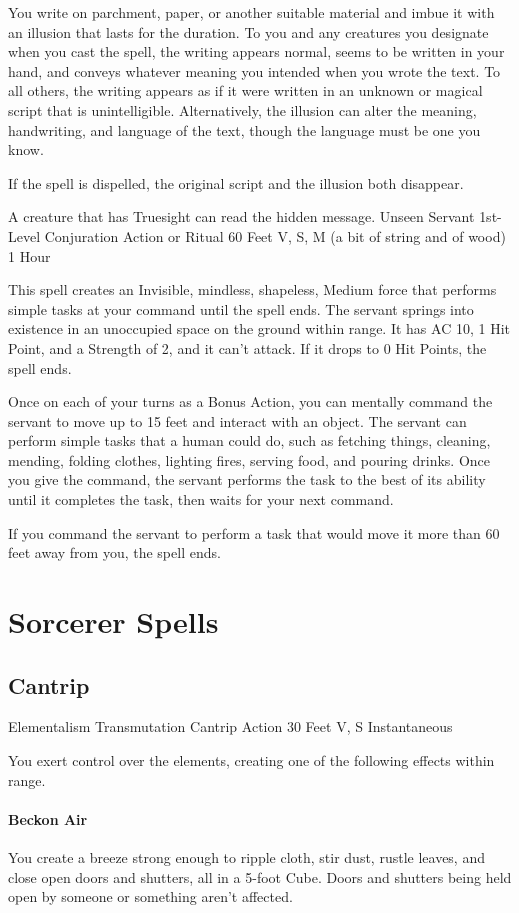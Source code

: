 \documentclass[letterpaper,openany,oneside,twocolumn]{book}
\begin{document}
You write on parchment, paper, or another suitable material and imbue it with an illusion that lasts for the duration. To you and any creatures you designate when you cast the spell, the writing appears normal, seems to be written in your hand, and conveys whatever meaning you intended when you wrote the text. To all others, the writing appears as if it were written in an unknown or magical script that is unintelligible. Alternatively, the illusion can alter the meaning, handwriting, and language of the text, though the language must be one you know.

If the spell is dispelled, the original script and the illusion both disappear.

A creature that has Truesight can read the hidden message.
\DndSpellHeader
  {Unseen Servant}
  {1st-Level Conjuration}
  {Action or Ritual}
  {60 Feet}
  {V, S, M (a bit of string and of wood)}
  {1 Hour}

This spell creates an Invisible, mindless, shapeless, Medium force that performs simple tasks at your command until the spell ends. The servant springs into existence in an unoccupied space on the ground within range. It has AC 10, 1 Hit Point, and a Strength of 2, and it can't attack. If it drops to 0 Hit Points, the spell ends.

Once on each of your turns as a Bonus Action, you can mentally command the servant to move up to 15 feet and interact with an object. The servant can perform simple tasks that a human could do, such as fetching things, cleaning, mending, folding clothes, lighting fires, serving food, and pouring drinks. Once you give the command, the servant performs the task to the best of its ability until it completes the task, then waits for your next command.

If you command the servant to perform a task that would move it more than 60 feet away from you, the spell ends.
\clearpage
\section*{Sorcerer Spells}
\subsection*{Cantrip}
\DndSpellHeader
  {Elementalism}
  {Transmutation Cantrip}
  {Action}
  {30 Feet}
  {V, S}
  {Instantaneous}
  
You exert control over the elements, creating one of the following effects within range.
\paragraph{Beckon Air} You create a breeze strong enough to ripple cloth, stir dust, rustle leaves, and close open doors and shutters, all in a 5-foot Cube. Doors and shutters being held open by someone or something aren't affected.
\end{document}
